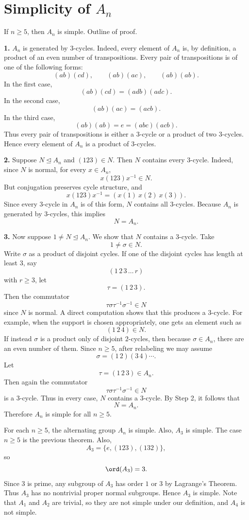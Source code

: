 
\section{Simplicity of $A_n$}

\begin{theorem}{
    If $n\geq 5$, then $A_n$ is simple.
}
Outline of proof.

\textbf{1.}
$A_n$ is generated by $3$-cycles.
Indeed, every element of $A_n$ is, by definition, a product of an even number of transpositions.
Every pair of transpositions is of one of the following forms:
\[
    (ab)(cd), \qquad (ab)(ac), \qquad (ab)(ab).
\]
In the first case,
\[
    (ab)(cd)=(adb)(adc).
\]
In the second case,
\[
    (ab)(ac)=(acb).
\]
In the third case,
\[
    (ab)(ab)=e=(abc)(acb).
\]
Thus every pair of transpositions is either a $3$-cycle or a product of two $3$-cycles.
Hence every element of $A_n$ is a product of $3$-cycles.

\textbf{2.}
Suppose $N\trianglelefteq A_n$ and $(123)\in N$.
Then $N$ contains every $3$-cycle.
Indeed, since $N$ is normal, for every $x\in A_n$,
\[
    x(123)x^{-1}\in N.
\]
But conjugation preserves cycle structure, and
\[
    x(123)x^{-1}=(x(1)\ x(2)\ x(3)).
\]
Since every $3$-cycle in $A_n$ is of this form, $N$ contains all $3$-cycles.
Because $A_n$ is generated by $3$-cycles, this implies
\[
    N=A_n.
\]

\textbf{3.}
Now suppose $1\neq N\trianglelefteq A_n$.
We show that $N$ contains a $3$-cycle.
Take
\[
    1\neq \sigma\in N.
\]
Write $\sigma$ as a product of disjoint cycles.
If one of the disjoint cycles has length at least $3$, say
\[
    (1\,2\,3\,\dots\,r)
\]
with $r\geq 3$, let
\[
    \tau=(1\,2\,3).
\]
Then the commutator
\[
    \tau\sigma\tau^{-1}\sigma^{-1}\in N
\]
since $N$ is normal.
A direct computation shows that this produces a $3$-cycle.
For example, when the support is chosen appropriately, one gets an element such as
\[
    (1\,2\,4)\in N.
\]
If instead $\sigma$ is a product only of disjoint $2$-cycles, then because $\sigma\in A_n$, there are an even number of them.
Since $n\geq 5$, after relabeling we may assume
\[
    \sigma=(1\,2)(3\,4)\cdots.
\]
Let
\[
    \tau=(1\,2\,3)\in A_n.
\]
Then again the commutator
\[
    \tau\sigma\tau^{-1}\sigma^{-1}\in N
\]
is a $3$-cycle.
Thus in every case, $N$ contains a $3$-cycle.
By Step 2, it follows that
\[
    N=A_n.
\]
Therefore $A_n$ is simple for all $n\geq 5$.
\end{theorem}

\begin{theorem}{
    For each $n\geq 5$, the alternating group $A_n$ is simple.
    Also, $A_3$ is simple.
}
The case $n\geq 5$ is the previous theorem.
Also,
\[
    A_3=\{e,(123),(132)\},
\]
so
\[
    \ord(A_3)=3.
\]
Since $3$ is prime, any subgroup of $A_3$ has order $1$ or $3$ by Lagrange's Theorem.
Thus $A_3$ has no nontrivial proper normal subgroups.
Hence $A_3$ is simple.
Note that $A_1$ and $A_2$ are trivial, so they are not simple under our definition, and $A_4$ is not simple.
\end{theorem}